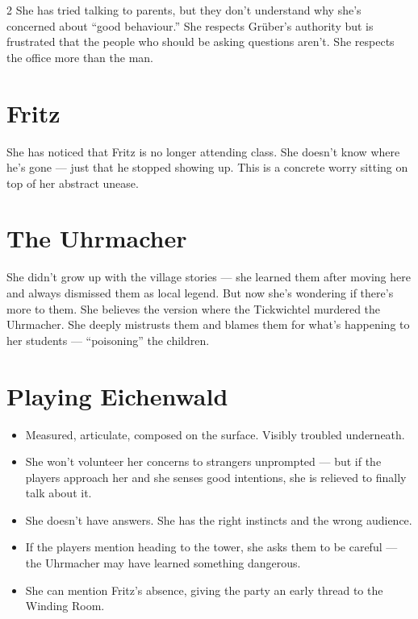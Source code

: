 \documentclass[10pt,letterpaper]{article}
\begin{document}
\begin{multicols}{2}
She has tried talking to parents, but they don't understand why she's concerned about ``good behaviour.'' She respects Grüber's authority but is frustrated that the people who should be asking questions aren't. She respects the office more than the man.

\section*{Fritz}
She has noticed that Fritz is no longer attending class. She doesn't know where he's gone --- just that he stopped showing up. This is a concrete worry sitting on top of her abstract unease.

\section*{The Uhrmacher}
She didn't grow up with the village stories --- she learned them after moving here and always dismissed them as local legend. But now she's wondering if there's more to them. She believes the version where the Tickwichtel murdered the Uhrmacher. She deeply mistrusts them and blames them for what's happening to her students --- ``poisoning'' the children.

\section*{Playing Eichenwald}
\begin{itemize}
\item Measured, articulate, composed on the surface. Visibly troubled underneath.
\item She won't volunteer her concerns to strangers unprompted --- but if the players approach her and she senses good intentions, she is relieved to finally talk about it.
\item She doesn't have answers. She has the right instincts and the wrong audience.
\item If the players mention heading to the tower, she asks them to be careful --- the Uhrmacher may have learned something dangerous.
\item She can mention Fritz's absence, giving the party an early thread to the Winding Room.
\end{itemize}

\end{multicols}

\newpage

\end{document}
